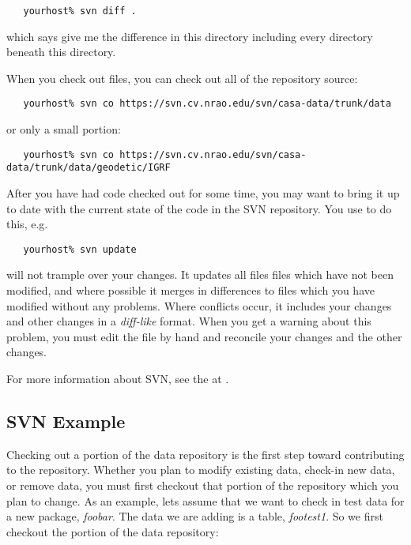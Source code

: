 \begin{verbatim}
   yourhost% svn diff .
\end{verbatim}

\noindent
which says give me the difference in this directory including every
directory beneath this directory.

When you check out files, you can check out all of the repository source:

\begin{verbatim}
   yourhost% svn co https://svn.cv.nrao.edu/svn/casa-data/trunk/data
\end{verbatim}

\noindent
or only a small portion:

\begin{verbatim}
   yourhost% svn co https://svn.cv.nrao.edu/svn/casa-data/trunk/data/geodetic/IGRF
\end{verbatim}

After you have had code checked out for some time, you may want to bring it
up to date with the current state of the code in the SVN repository. You use
 to do this, e.g.

\begin{verbatim}
   yourhost% svn update
\end{verbatim}

\noindent
{} will not trample over your changes. It updates all files
files which have not been modified, and where possible it merges in
differences to files which you have modified without any problems. Where
conflicts occur, it includes your changes and other changes in
a \textit{diff-like} format. When you get a warning about this problem,
you must edit the file by hand and reconcile your changes and the other
changes.

For more information about SVN, see
the 
at .

\subsection*{SVN Example}
\label{data repository svn example}

Checking out a portion of the data repository is the first step toward
contributing to the repository. Whether you plan to modify existing
data, check-in new data, or remove data, you must first checkout that
portion of the repository which you plan to change. As an example, lets
assume that we want to check in test data for a new \aipspp package,
\textit{foobar}. The data we are adding is a table, \textit{footest1}.
So we first checkout the  portion of the data repository:

